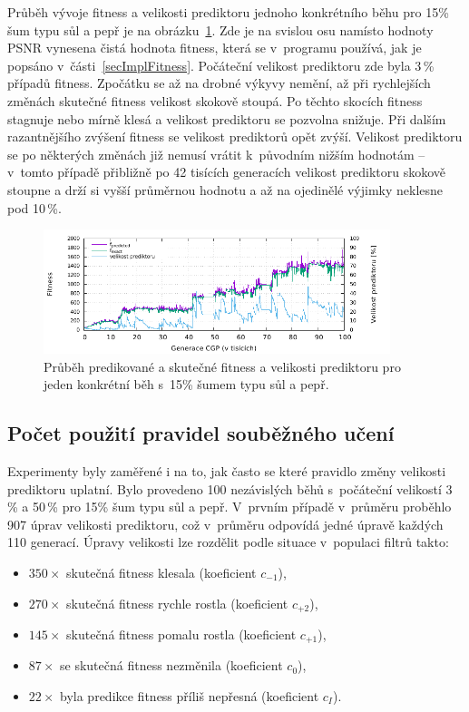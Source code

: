 Průběh vývoje fitness a velikosti prediktoru jednoho konkrétního běhu pro 15\% šum typu sůl a pepř je na obrázku~\ref{plotFitPred}. Zde je na svislou osu namísto hodnoty PSNR vynesena čistá hodnota fitness, která se v~programu používá, jak je popsáno v~části~\ref{secImplFitness}. Počáteční velikost prediktoru zde byla 3\,\% případů fitness. Zpočátku se až na drobné výkyvy nemění, až při rychlejších změnách skutečné fitness velikost skokově stoupá. Po těchto skocích fitness stagnuje nebo mírně klesá a velikost prediktoru se pozvolna snižuje. Při dalším razantnějšího zvýšení fitness se velikost prediktorů opět zvýší. Velikost prediktoru se po některých změnách již nemusí vrátit k~původním nižším hodnotám -- v~tomto případě přibližně po 42 tisících generacích velikost prediktoru skokově stoupne a drží si vyšší průměrnou hodnotu a až na ojedinělé výjimky neklesne pod 10\,\%.

\begin{figure}[htb]
    \centering
    \includegraphics[width=0.9\textwidth]{fig/plot/run-fitpred1.pdf}
    \caption{Průběh predikované a skutečné fitness a velikosti prediktoru pro jeden konkrétní běh s~15\% šumem typu sůl a pepř.}
    \label{plotFitPred}
\end{figure}

\subsection{Počet použití pravidel souběžného učení}

Experimenty byly zaměřené i na to, jak často se které pravidlo změny velikosti prediktoru uplatní. Bylo provedeno 100 nezávislých běhů s~počáteční velikostí 3\,\% a 50\,\% pro 15\% šum typu sůl a pepř. V~prvním případě v~průměru proběhlo 907 úprav velikosti prediktoru, což v~průměru odpovídá jedné úpravě každých 110 generací. Úpravy velikosti lze rozdělit podle situace v~populaci filtrů takto:

\begin{itemize}
    \item $350\times$ skutečná fitness klesala (koeficient $c_{-1}$),
    \item $270\times$ skutečná fitness rychle rostla (koeficient $c_{+2}$),
    \item $145\times$ skutečná fitness pomalu rostla (koeficient $c_{+1}$),
    \item $87\times$ se skutečná fitness nezměnila (koeficient $c_{0}$),
    \item $22\times$ byla predikce fitness příliš nepřesná (koeficient $c_{I}$).
\end{itemize}

